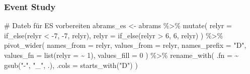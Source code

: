 \documentclass[
  a4paper,
  DIV=11,
  oneside]{scrreprt}
\newenvironment{Shaded}{\begin{snugshade}}{\end{snugshade}}
\newcommand{\AttributeTok}[1]{\textcolor[rgb]{0.40,0.45,0.13}{#1}}
\newcommand{\CommentTok}[1]{\textcolor[rgb]{0.37,0.37,0.37}{#1}}
\newcommand{\DecValTok}[1]{\textcolor[rgb]{0.68,0.00,0.00}{#1}}
\newcommand{\FunctionTok}[1]{\textcolor[rgb]{0.28,0.35,0.67}{#1}}
\newcommand{\NormalTok}[1]{\textcolor[rgb]{0.00,0.23,0.31}{#1}}
\newcommand{\OtherTok}[1]{\textcolor[rgb]{0.00,0.23,0.31}{#1}}
\newcommand{\SpecialCharTok}[1]{\textcolor[rgb]{0.37,0.37,0.37}{#1}}
\newcommand{\StringTok}[1]{\textcolor[rgb]{0.13,0.47,0.30}{#1}}
\begin{document}
\subsubsection{Event Study}\label{event-study}

\begin{Shaded}
\begin{Highlighting}[]
\CommentTok{\# Dateb für ES vorbereiten}
\NormalTok{abrams\_es }\OtherTok{\textless{}{-}}\NormalTok{ abrams }\SpecialCharTok{\%\textgreater{}\%}
  \FunctionTok{mutate}\NormalTok{(}
    \AttributeTok{relyr =} \FunctionTok{if\_else}\NormalTok{(relyr }\SpecialCharTok{\textless{}} \SpecialCharTok{{-}}\DecValTok{7}\NormalTok{, }\SpecialCharTok{{-}}\DecValTok{7}\NormalTok{, relyr),}
    \AttributeTok{relyr =} \FunctionTok{if\_else}\NormalTok{(relyr }\SpecialCharTok{\textgreater{}} \DecValTok{6}\NormalTok{, }\DecValTok{6}\NormalTok{, relyr)}
\NormalTok{  ) }\SpecialCharTok{\%\textgreater{}\%}
  \FunctionTok{pivot\_wider}\NormalTok{(}
    \AttributeTok{names\_from =}\NormalTok{ relyr, }
    \AttributeTok{values\_from =}\NormalTok{ relyr, }
    \AttributeTok{names\_prefix =} \StringTok{"D"}\NormalTok{, }
    \AttributeTok{values\_fn =} \FunctionTok{list}\NormalTok{(}\AttributeTok{relyr =} \SpecialCharTok{\textasciitilde{}} \DecValTok{1}\NormalTok{), }
    \AttributeTok{values\_fill =} \DecValTok{0}
\NormalTok{  ) }\SpecialCharTok{\%\textgreater{}\%}
  \FunctionTok{rename\_with}\NormalTok{(}
    \AttributeTok{.fn =} \SpecialCharTok{\textasciitilde{}} \FunctionTok{gsub}\NormalTok{(}\StringTok{"{-}"}\NormalTok{, }\StringTok{"\_"}\NormalTok{, .), }
    \AttributeTok{.cols =} \FunctionTok{starts\_with}\NormalTok{(}\StringTok{"D"}\NormalTok{)}
\NormalTok{  )}
\end{Highlighting}
\end{Shaded}
\end{document}
